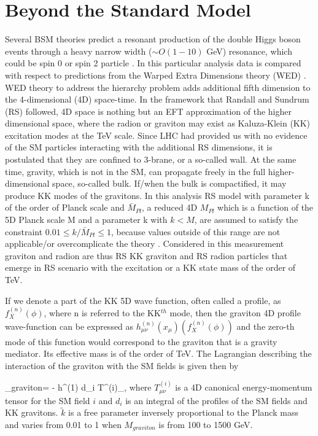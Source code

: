 \section{Beyond the Standard Model}

Several BSM theories \cite{Huang:2017nnw, Dolan:2012ac, Kanemura:2016tan} predict a resonant production of the double Higgs boson events through a heavy narrow width ($\sim O(1-10)$ GeV) resonance, which could be spin 0 or spin 2 particle \cite{Sirunyan:2018iwt}. In this particular analysis data is compared with respect to predictions from the Warped Extra Dimensions theory (WED) \cite{Oliveira:2014kla}. WED theory to address the hierarchy problem adds additional fifth dimension to the 4-dimensional (4D) space-time. In the framework that Randall and Sundrum (RS) \cite{Randall:1999ee} followed, 4D space is nothing but an EFT approximation of the higher dimensional space, where the radion or graviton may exist as Kaluza-Klein (KK) \cite{Uzawa:1999pg} excitation modes at the TeV scale. Since LHC had provided us with no evidence of the SM particles interacting with the additional RS dimensions, it is postulated that they are confined to 3-brane, or a so-called wall. At the same time, gravity, which is not in the SM, can propagate freely in the full higher-dimensional space, so-called bulk. If/when the bulk is compactified, it may produce KK modes of the gravitons. In this analysis RS model with parameter k of the order of Planck scale and $\bar{M}_{Pl}$, a reduced 4D $M_{Pl}$ which is a function of the 5D Planck scale M and a parameter k with $k<M$, are assumed to satisfy the constraint $0.01 \leq k / \bar{M}_{Pl} \leq 1$, because values outside of this range are not applicable/or overcomplicate the theory \cite{Davoudiasl:1999jd}. Considered in this measurement graviton and radion are thus RS KK graviton and RS radion particles that emerge in RS scenario with the excitation or a KK state mass of the order of TeV. 

If we denote a part of the KK 5D wave function, often called a profile, as $f^{(n)}_X(\phi)$, where n is referred to the KK$^{th}$ mode, then the graviton 4D profile wave-function can be expressed as $h^{(n)}_{\mu\nu}(x_\mu)(f^{(n)}_X(\phi))$ and the zero-th mode of this function would correspond to the graviton that is a gravity mediator. Its effective mass is of the order of TeV. The Lagrangian describing the interaction of the graviton with the SM fields is given then by 

\beqn\label{lagr_graviton}
\Lagr_{graviton}=  -  h^{\mu\nu(1)} \times d_i T^{(i)}_{\mu\nu},  
\eeqn
where $T^{(i)}_{\mu\nu}$ is a 4D canonical energy-momentum tensor \cite{Forger:2003ut} for the SM field $i$ and $d_i$ is an integral of the profiles of the SM fields and KK gravitons. $\tilde{k}$ is a free parameter inversely proportional to the Planck mass and varies from 0.01 to 1 when $M_{graviton}$ is from 100 to 1500 GeV. 


